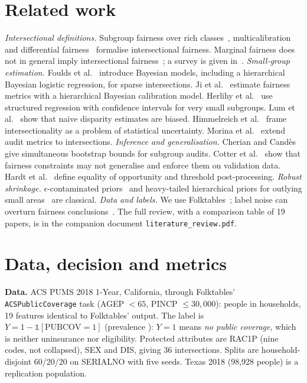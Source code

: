 \documentclass[11pt]{article}
\begin{document}
\section{Related work}\label{sec:related}
\emph{Intersectional definitions.} Subgroup fairness over rich classes~\cite{kearns2018}, multicalibration~\cite{hebert2018}
and differential fairness~\cite{foulds2020icde} formalise intersectional fairness. Marginal fairness does not in general
imply intersectional fairness~\cite{molina2022}; a survey is given in~\cite{gohar2023}.
\emph{Small-group estimation.} Foulds et al.~\cite{foulds2020bayes} introduce Bayesian models, including a hierarchical
Bayesian logistic regression, for sparse intersections. Ji et al.~\cite{ji2020} estimate fairness metrics with a
hierarchical Bayesian calibration model. Herlihy et al.~\cite{herlihy2024} use structured regression with confidence
intervals for very small subgroups. Lum et al.~\cite{lum2022} show that naive disparity estimates are biased.
Himmelreich et al.~\cite{himmelreich2025} frame intersectionality as a problem of statistical uncertainty. Morina et
al.~\cite{morina2019} extend audit metrics to intersections.
\emph{Inference and generalisation.} Cherian and Cand\`es~\cite{cherian2024} give simultaneous bootstrap bounds for
subgroup audits. Cotter et al.~\cite{cotter2019} show that fairness constraints may not generalise and enforce them on
validation data. Hardt et al.~\cite{hardt2016} define equality of opportunity and threshold post-processing.
\emph{Robust shrinkage.} $\epsilon$-contaminated priors~\cite{berger1986} and heavy-tailed hierarchical priors for outlying
small areas~\cite{datta1995} are classical.
\emph{Data and labels.} We use Folktables~\cite{ding2021,folktables}; label noise can overturn fairness
conclusions~\cite{fogliato2020}. The full review, with a comparison table of 19 papers, is in the companion document
\texttt{literature\_review.pdf}.

\section{Data, decision and metrics}
\textbf{Data.} ACS PUMS 2018 1-Year, California, through Folktables' \texttt{ACSPublicCoverage} task (AGEP $<65$, PINCP
$\le30{,}000$): \Nall{} people in \Nhh{} households, 19 features identical to Folktables' output. The label is
$Y=1-\mathbb 1[\text{PUBCOV}=1]$ (prevalence \prev): $Y=1$ means \emph{no public coverage}, which is neither uninsurance
nor eligibility. Protected attributes are RAC1P (nine codes, not collapsed), SEX and DIS, giving 36 intersections. Splits
are household-disjoint 60/20/20 on SERIALNO with five seeds. Texas 2018 (98,928 people) is a replication population.
\end{document}
